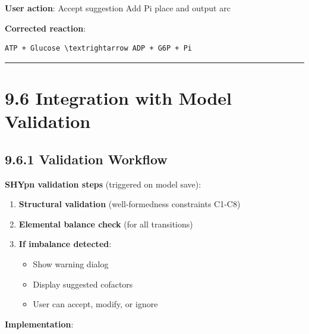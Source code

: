 \textbf{User action}: Accept suggestion \textrightarrow Add Pi place and output arc

\textbf{Corrected reaction}:

\begin{lstlisting}
ATP + Glucose \textrightarrow ADP + G6P + Pi
\end{lstlisting}

\begin{center}\rule{0.5\linewidth}{0.5pt}\end{center}

\hypertarget{integration-with-model-validation}{%
\section{9.6 Integration with Model
Validation}\label{integration-with-model-validation}}

\hypertarget{validation-workflow}{%
\subsection{9.6.1 Validation Workflow}\label{validation-workflow}}

\textbf{SHYpn validation steps} (triggered on model save):

\begin{enumerate}
\def\labelenumi{\arabic{enumi}.}
\tightlist
\item
  \textbf{Structural validation} (well-formedness constraints C1-C8)
\item
  \textbf{Elemental balance check} (for all transitions)
\item
  \textbf{If imbalance detected}:

  \begin{itemize}
  \tightlist
  \item
    Show warning dialog
  \item
    Display suggested cofactors
  \item
    User can accept, modify, or ignore
  \end{itemize}
\end{enumerate}

\textbf{Implementation}:

